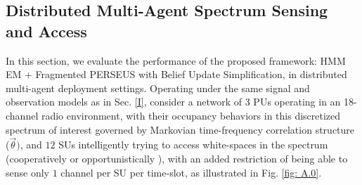 \documentclass[12pt, draftcls, onecolumn]{IEEEtran}
\begin{document}
\subsection{Distributed Multi-Agent Spectrum Sensing and Access}
In this section, we evaluate the performance of the proposed framework: HMM EM + Fragmented PERSEUS with Belief Update Simplification, in distributed multi-agent deployment settings. Operating under the same signal and observation models as in Sec. \ref{I}, consider a network of $3$ PUs operating in an 18-channel radio environment, with their occupancy behaviors in this discretized spectrum of interest governed by Markovian time-frequency correlation structure ($\vec{\theta})$, and $12$ SUs intelligently trying to access white-spaces in the spectrum (cooperatively \cite{WCL:5} or opportunistically \cite{WCL:MIT}), with an added restriction of being able to sense only $1$ channel per SU per time-slot, as illustrated in Fig. \ref{fig: A.0}.
\end{document}
